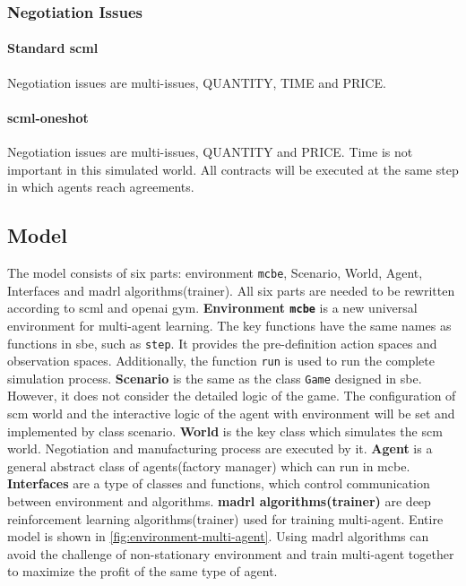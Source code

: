 \subsubsection{Negotiation Issues}
\paragraph{Standard \gls{scml}} Negotiation issues are multi-issues, QUANTITY, TIME and PRICE. 
\paragraph{\gls{scml-oneshot}} Negotiation issues are multi-issues, QUANTITY and PRICE. Time is not important in this simulated world. All contracts will be executed at the same step in which agents reach agreements.

\subsection{Model}
The model consists of six parts: environment \texttt{\gls{mcbe}}, Scenario, World, Agent, Interfaces and \gls{madrl} algorithms(trainer).
All six parts are needed to be rewritten according to \gls{scml} and \gls{openai gym}. 
\textbf{Environment \texttt{\gls{mcbe}}} is a new universal environment for multi-agent learning. The key functions have the same names as functions in \gls{sbe}, such as \texttt{step}. It provides the pre-definition action spaces and observation spaces.  Additionally, the function \texttt{run} is used to run the complete simulation process. 
\textbf{Scenario} is the same as the class \texttt{Game} designed in \gls{sbe}. However, it does not consider the detailed logic of the game. The configuration of \gls{scm} world and the interactive logic of the agent with environment will be set and implemented by class scenario.
\textbf{World} is the key class which simulates the \gls{scm} world. Negotiation and manufacturing process are executed by it.
\textbf{Agent} is a general abstract class of agents(factory manager) which can run in \gls{mcbe}. 
\textbf{Interfaces} are a type of classes and functions, which control communication between environment and algorithms.
\textbf{\gls{madrl} algorithms(trainer)} are deep reinforcement learning algorithms(trainer) used for training multi-agent.
Entire model is shown in \ref{fig:environment-multi-agent}. Using \gls{madrl} algorithms can avoid the challenge of non-stationary environment and train multi-agent together to maximize the profit of the same type of agent.


